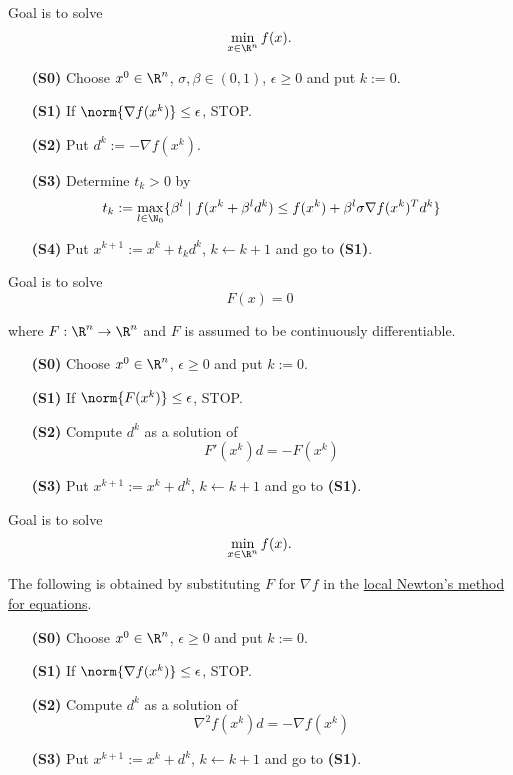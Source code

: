 \label{ae01f6d}

Goal is to solve
$$
  \min_{x\in\R^n}f(x).
$$

\begin{enumerate}
  \item [\textbf{(S0)}] Choose $x^0\in\R^n$, $\sigma,\beta\in(0,1)$, $\epsilon\geq0$ and put $k:=0$.
  \item [\textbf{(S1)}] If $\norm{\nabla f(x^k)}\leq\epsilon$, STOP.
  \item [\textbf{(S2)}] Put $d^k:=-\nabla f(x^k)$.
  \item [\textbf{(S3)}] Determine $t_k>0$ by
        $$
          t_k:=\max_{l\in\N_0}\{\beta^l\mid f(x^k+\beta^ld^k)\leq f(x^k)+\beta^l\sigma\nabla f(x^k)^Td^k\}
        $$
  \item [\textbf{(S4)}] Put $x^{k+1}:=x^k+t_kd^k$, $k\gets k+1$ and go to \textbf{(S1)}.
\end{enumerate}

\label{abbc9be}

Goal is to solve
$$
  F(x)=0
$$

where $F:\R^n\to\R^n$ and $F$ is assumed to be continuously differentiable.

\begin{enumerate}
  \item [\textbf{(S0)}] Choose $x^0\in\R^n$, $\epsilon\geq0$ and put $k:=0$.
  \item [\textbf{(S1)}] If $\norm{F(x^k)}\leq\epsilon$, STOP.
  \item [\textbf{(S2)}] Compute $d^k$ as a solution of
        $$
          F'(x^k)d=-F(x^k)
        $$
  \item [\textbf{(S3)}] Put $x^{k+1}:=x^k+d^k$, $k\gets k+1$ and go to \textbf{(S1)}.
\end{enumerate}

\label{c2bcc4e}

Goal is to solve
$$
  \min_{x\in\R^n}f(x).
$$

The following is obtained by substituting $F$ for $\nabla f$ in the
\href{abbc9be}{local Newton's method for equations}.

\begin{enumerate}
  \item [\textbf{(S0)}] Choose $x^0\in\R^n$, $\epsilon\geq0$ and put $k:=0$.
  \item [\textbf{(S1)}] If $\norm{\nabla f(x^k)}\leq\epsilon$, STOP.
  \item [\textbf{(S2)}] Compute $d^k$ as a solution of
        $$
          \nabla^2f(x^k)d=-\nabla f(x^k)
        $$
  \item [\textbf{(S3)}] Put $x^{k+1}:=x^k+d^k$, $k\gets k+1$ and go to \textbf{(S1)}.
\end{enumerate}

